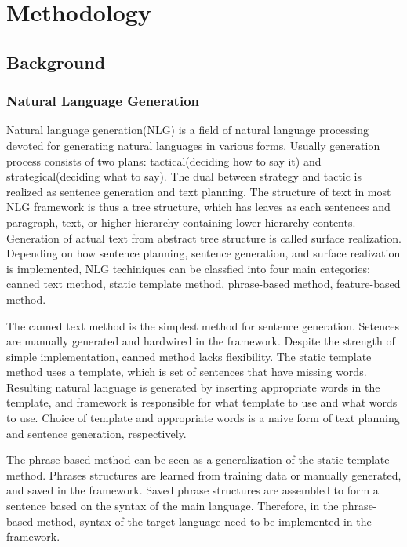 \documentclass[11pt,letterpaper]{article}
\begin{document}
\section{Methodology} 

\subsection{Background} 

\subsubsection{Natural Language Generation} 

Natural language generation(NLG) is a field of natural language processing devoted for generating natural languages in various forms. Usually generation process consists of two plans: tactical(deciding how to say it) and strategical(deciding what to say). The dual between strategy and tactic is realized as sentence generation and text planning. The structure of text in most NLG framework is thus a tree structure, which has leaves as each sentences and paragraph, text, or higher hierarchy containing lower hierarchy contents. Generation of actual text from abstract tree structure is called surface realization. Depending on how sentence planning, sentence generation, and surface realization is implemented, NLG techiniques can be classfied into four main categories\cite{ency}: canned text method, static template method, phrase-based method, feature-based method. 

The canned text method is the simplest method for sentence generation. Setences are manually generated and hardwired in the framework. Despite the strength of simple implementation, canned method lacks flexibility. The static template method uses a template, which is set of sentences that have missing words. Resulting natural language is generated by inserting appropriate words in the template, and framework is responsible for what template to use and what words to use. Choice of template and appropriate words is a naive form of text planning and sentence generation, respectively. 

The phrase-based method can be seen as a generalization of the static template method. Phrases structures are learned from training data or manually generated, and saved in the framework. Saved phrase structures are assembled to form a sentence based on the syntax of the main language. Therefore, in the phrase-based method, syntax of the target language need to be implemented in the framework. 
\end{document}
